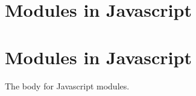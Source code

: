 %
%
%

\newcommand{\CntLIHeadingText}{\section{Modules in Javascript}\label{sec:javascript-modules-1.0.0}}

\ifdefined\CntLIHeading
    \CntLIHeadingText
\else
    \ifdefined\CntLIHeadingJavascriptModulesVIvOvO
        \CntLIHeadingText
    \fi
\fi

The body for Javascript modules.
